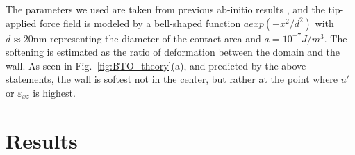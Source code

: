 The parameters we used are taken from previous ab-initio results \cite{Marton2010}, and the tip-applied force field is modeled by a bell-shaped function $a exp(-x^2/d^2)$ with $d \approx 20$nm representing the diameter of the contact area and $a = 10^{-7} J/m^3$. The softening is estimated as the ratio of deformation between the domain and the wall.
As seen in Fig.~\ref{fig:BTO_theory}(a), and predicted by the above statements, the wall is softest not in the center, but rather at the point where $u'$ or $\varepsilon_{xz}$ is highest.



\section{Results}

\printbibliography
